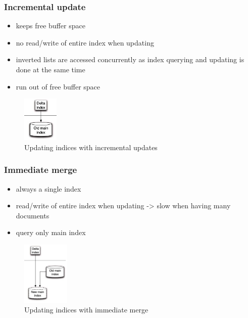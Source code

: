 \subsubsection{Incremental update}
\begin{itemize}
    \item keeps free buffer space
    \item no read/write of entire index when updating
    \item inverted lists are accessed concurrently as index querying and updating is done at the same time
    \item run out of free buffer space
\end{itemize}
\begin{figure}[h!]
    \centering
    \includegraphics[width=0.15\textwidth]{figures/index_incremental_update.png}
    \caption{Updating indices with incremental updates}
\end{figure}

\subsubsection{Immediate merge}
\begin{itemize}
    \item always a single index
    \item read/write of entire index when updating -> slow when having many documents
    \item query only main index
\end{itemize}
\begin{figure}[ht]
    \centering
    \includegraphics[width=0.2\textwidth]{figures/index_immediate_merge.png}
    \caption{Updating indices with immediate merge}
\end{figure}

